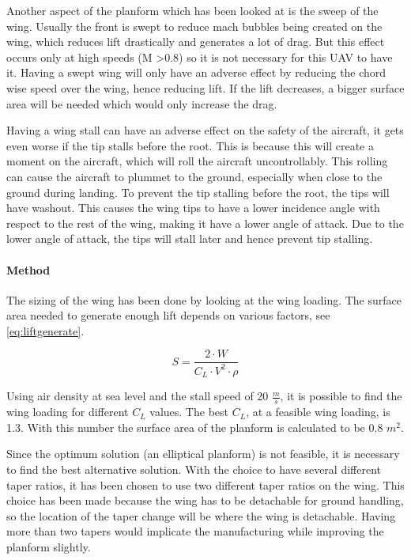 Another aspect of the planform which has been looked at is the sweep of the wing. Usually the front is swept to reduce mach bubbles being created on the wing, which reduces lift drastically and generates a lot of drag. But this effect occurs only at high speeds (M \textgreater 0.8) so it is not necessary for this UAV to have it. Having a swept wing will only have an adverse effect by reducing the chord wise speed over the wing, hence reducing lift. If the lift decreases, a bigger surface area will be needed which would only increase the drag.

Having a wing stall can have an adverse effect on the safety of the aircraft, it gets even worse if the tip stalls before the root. This is because this will create a moment on the aircraft, which will roll the aircraft uncontrollably. This rolling can cause the aircraft to plummet to the ground, especially when close to the ground during landing. To prevent the tip stalling before the root, the tips will have washout. This causes the wing tips to have a lower incidence angle with respect to the rest of the wing, making it have a lower angle of attack. Due to the lower angle of attack, the tips will stall later and hence prevent tip stalling.

\paragraph{Method} The sizing of the wing has been done by looking at the wing loading. The surface area needed to generate enough lift depends on various factors, see \autoref{eq:liftgenerate}.

\begin{equation}\label{eq:liftgenerate}
    S = \frac{2\cdot W}{C_{L}\cdot V^2\cdot \rho}
\end{equation}

Using air density at sea level and the stall speed of 20 $\frac{m}{s}$, it is possible to find the wing loading for different $C_{L}$ values. The best $C_{L}$, at a feasible wing loading, is 1.3. With this number the surface area of the planform is calculated to be 0.8 $m^2$.

Since the optimum solution (an elliptical planform) is not feasible, it is necessary to find the best alternative solution. With the choice to have several different taper ratios, it has been chosen to use two different taper ratios on the wing. This choice has been made because the wing has to be detachable for ground handling, so the location of the taper change will be where the wing is detachable. Having more than two tapers would implicate the manufacturing while improving the planform slightly. 

